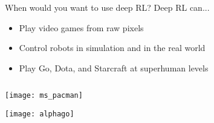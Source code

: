 \begin{frame}{When would you want to use deep RL?}
Deep RL can...
\begin{itemize}
\item Play video games from raw pixels
\item Control robots in simulation and in the real world
\item Play Go, Dota, and Starcraft at superhuman levels
\end{itemize}

\begin{columns}
\begin{column}{0.33\textwidth}
    \begin{center}
     \texttt{[image: ms\_pacman]}

     \texttt{[image: alphago]}
     \end{center}
\end{column}
\begin{column}{0.67\textwidth}
\end{column}
\end{columns}
\end{frame}